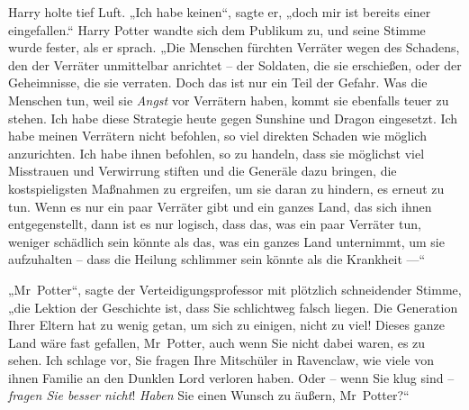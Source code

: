 Harry holte tief Luft.
„Ich habe keinen“, sagte er, „doch mir ist bereits einer eingefallen.“ Harry Potter wandte sich dem Publikum zu, und seine Stimme wurde fester, als er sprach.
„Die Menschen fürchten Verräter wegen des Schadens, den der Verräter unmittelbar anrichtet – der Soldaten, die sie erschießen, oder der Geheimnisse, die sie verraten. Doch das ist nur ein Teil der Gefahr. Was die Menschen tun, weil sie \emph{Angst} vor Verrätern haben, kommt sie ebenfalls teuer zu stehen. Ich habe diese Strategie heute gegen Sunshine und Dragon eingesetzt. Ich habe meinen Verrätern nicht befohlen, so viel direkten Schaden wie möglich anzurichten. Ich habe ihnen befohlen, so zu handeln, dass sie möglichst viel Misstrauen und Verwirrung stiften und die Generäle dazu bringen, die kostspieligsten Maßnahmen zu ergreifen, um sie daran zu hindern, es erneut zu tun. Wenn es nur ein paar Verräter gibt und ein ganzes Land, das sich ihnen entgegenstellt, dann ist es nur logisch, dass das, was ein paar Verräter tun, weniger schädlich sein könnte als das, was ein ganzes Land unternimmt, um sie aufzuhalten – dass die Heilung schlimmer sein könnte als die Krankheit —“

„Mr~Potter“, sagte der Verteidigungsprofessor mit plötzlich schneidender Stimme, „die Lektion der Geschichte ist, dass Sie schlichtweg falsch liegen. Die Generation Ihrer Eltern hat zu wenig getan, um sich zu einigen, nicht zu viel! Dieses ganze Land wäre fast gefallen, Mr~Potter, auch wenn Sie nicht dabei waren, es zu sehen. Ich schlage vor, Sie fragen Ihre Mitschüler in Ravenclaw, wie viele von ihnen Familie an den Dunklen Lord verloren haben. Oder – wenn Sie klug sind – \emph{fragen Sie besser nicht}! \emph{Haben} Sie einen Wunsch zu äußern, Mr~Potter?“


